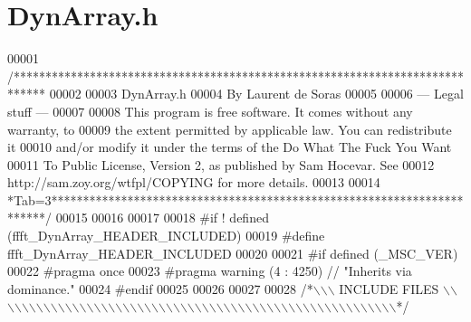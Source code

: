 \hypertarget{a00091_source}{\section{Dyn\+Array.\+h}
\label{a00091_source}
}

\begin{DoxyCode}
00001 \textcolor{comment}{/*****************************************************************************}
00002 \textcolor{comment}{}
00003 \textcolor{comment}{        DynArray.h}
00004 \textcolor{comment}{        By Laurent de Soras}
00005 \textcolor{comment}{}
00006 \textcolor{comment}{--- Legal stuff ---}
00007 \textcolor{comment}{}
00008 \textcolor{comment}{This program is free software. It comes without any warranty, to}
00009 \textcolor{comment}{the extent permitted by applicable law. You can redistribute it}
00010 \textcolor{comment}{and/or modify it under the terms of the Do What The Fuck You Want}
00011 \textcolor{comment}{To Public License, Version 2, as published by Sam Hocevar. See}
00012 \textcolor{comment}{http://sam.zoy.org/wtfpl/COPYING for more details.}
00013 \textcolor{comment}{}
00014 \textcolor{comment}{*Tab=3***********************************************************************/}
00015 
00016 
00017 
00018 \textcolor{preprocessor}{#if ! defined (ffft\_DynArray\_HEADER\_INCLUDED)}
00019 \textcolor{preprocessor}{#define ffft\_DynArray\_HEADER\_INCLUDED}
00020 
00021 \textcolor{preprocessor}{#if defined (\_MSC\_VER)}
00022 \textcolor{preprocessor}{    #pragma once}
00023 \textcolor{preprocessor}{    #pragma warning (4 : 4250) // "Inherits via dominance."}
00024 \textcolor{preprocessor}{#endif}
00025 
00026 
00027 
00028 \textcolor{comment}{/*\(\backslash\)\(\backslash\)\(\backslash\) INCLUDE FILES \(\backslash\)\(\backslash\)\(\backslash\)\(\backslash\)\(\backslash\)\(\backslash\)\(\backslash\)\(\backslash\)\(\backslash\)\(\backslash\)\(\backslash\)\(\backslash\)\(\backslash\)\(\backslash\)\(\backslash\)\(\backslash\)\(\backslash\)\(\backslash\)\(\backslash\)\(\backslash\)\(\backslash\)\(\backslash\)\(\backslash\)\(\backslash\)\(\backslash\)\(\backslash\)\(\backslash\)\(\backslash\)\(\backslash\)\(\backslash\)\(\backslash\)\(\backslash\)\(\backslash\)\(\backslash\)\(\backslash\)\(\backslash\)\(\backslash\)\(\backslash\)\(\backslash\)\(\backslash\)\(\backslash\)\(\backslash\)\(\backslash\)\(\backslash\)\(\backslash\)\(\backslash\)\(\backslash\)\(\backslash\)\(\backslash\)\(\backslash\)\(\backslash\)\(\backslash\)\(\backslash\)\(\backslash\)\(\backslash\)\(\backslash\)*/}

\end{DoxyCode}
